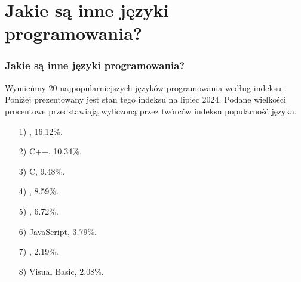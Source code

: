\documentclass[10pt,t]{beamer}
\begin{document}
\section{Jakie są inne języki programowania?}


\begin{frame}
  \frametitle{Jakie są inne języki programowania?}


  Wymieńmy 20 najpopularniejszych języków programowania według indeksu
  . Poniżej
  prezentowany jest stan tego indeksu na lipiec 2024. Podane wielkości
  procentowe przedstawiają wyliczoną przez twórców indeksu popularność
  języka.



  \begin{itemize}

  \item[1)] , 16.12\%.

  \item[2)] C++, 10.34\%.

  \item[3)] C, 9.48\%.

  \item[4)] , 8.59\%.

  \item[5)]
    ,
    6.72\%.

  \item[6)] JavaScript, 3.79\%.

  \item[7)] , 2.19\%.

  \item[8)] Visual Basic, 2.08\%.

  \end{itemize}

\end{frame}
\end{document}
